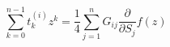 \begin{equation}
\sum_{k=0}^{n-1}t^{(i)}_k z^k =\frac{1}{4} \sum_{j=1}^{n} G_{ij}
\frac{\partial}{\partial
S_j} f(z)
\end{equation}

